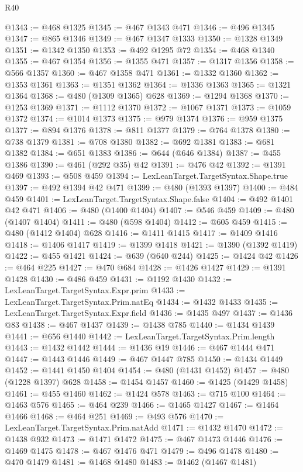 \begin{lexlean}{R40}
\begin{coremodule}
{{{{{{{{{{{{{{{{{{{{{{{{{{{{{{{{{{{{{{{{{{{{{{{{{{{{{{{{{{{{{{{{{{{{{{{{{{{{{{{{{{{{{{{{{{{{{{{{{{{{{{{{{{{{{@1343 := @468 @1325
@1345 := @467 @1343 @471
@1346 := @496 @1345
@1347 := @865 @1346
@1349 := @467 @1347 @1333
@1350 := @1328 @1349
@1351 := @1342 @1350
@1353 := @492 @1295 @72
@1354 := @468 @1340
@1355 := @467 @1354
@1356 := @1355 @471
@1357 := @1317 @1356
@1358 := @566 @1357
@1360 := @467 @1358 @471
@1361 := @1332 @1360
@1362 := @1353 @1361
@1363 := @1351 @1362
@1364 := @1336 @1363
@1365 := @1321 @1364
@1368 := @480 (@1309 @1365) @628
@1369 := @1294 @1368
@1370 := @1253 @1369
@1371 := @1112 @1370
@1372 := @1067 @1371
@1373 := @1059 @1372
@1374 := @1014 @1373
@1375 := @979 @1374
@1376 := @959 @1375
@1377 := @894 @1376
@1378 := @811 @1377
@1379 := @764 @1378
@1380 := @738 @1379
@1381 := @708 @1380
@1382 := @692 @1381
@1383 := @681 @1382
@1384 := @651 @1383
@1386 := @644 (@646 @1384)
@1387 := @455 @1386
@1390 := @461 (@292 @35) @42
@1391 := @476 @42
@1392 := @1391 @469
@1393 := @508 @459
@1394 := LexLeanTarget.TargetSyntax.Shape.true
@1397 := @492 @1394 @42 @471
@1399 := @480 (@1393 @1397)
@1400 := @484 @459
@1401 := LexLeanTarget.TargetSyntax.Shape.false
@1404 := @492 @1401 @42 @471
@1406 := @480 (@1400 @1404)
@1407 := @546 @459
@1409 := @480 (@1407 @1404)
@1411 := @480 (@598 @1404)
@1412 := @605 @459
@1415 := @480 (@1412 @1404) @628
@1416 := @1411 @1415
@1417 := @1409 @1416
@1418 := @1406 @1417
@1419 := @1399 @1418
@1421 := @1390 (@1392 @1419)
@1422 := @455 @1421
@1424 := @639 (@640 @244)
@1425 := @1424 @42
@1426 := @464 @225
@1427 := @470 @684
@1428 := @1426 @1427
@1429 := @1391 @1428
@1430 := @486 @459
@1431 := @1192 @1430
@1432 := LexLeanTarget.TargetSyntax.Expr.prim
@1433 := LexLeanTarget.TargetSyntax.Prim.natEq
@1434 := @1432 @1433
@1435 := LexLeanTarget.TargetSyntax.Expr.field
@1436 := @1435 @497
@1437 := @1436 @83
@1438 := @467 @1437
@1439 := @1438 @785
@1440 := @1434 @1439
@1441 := @656 @1440
@1442 := LexLeanTarget.TargetSyntax.Prim.length
@1443 := @1432 @1442
@1444 := @1436 @19
@1446 := @467 @1444 @471
@1447 := @1443 @1446
@1449 := @467 @1447 @785
@1450 := @1434 @1449
@1452 := @1441 @1450 @1404
@1454 := @480 (@1431 @1452)
@1457 := @480 (@1228 @1397) @628
@1458 := @1454 @1457
@1460 := @1425 (@1429 @1458)
@1461 := @455 @1460
@1462 := @1424 @578
@1463 := @715 @100
@1464 := @1463 @576
@1465 := @464 @239
@1466 := @1465 @1427
@1467 := @1464 @1466
@1468 := @464 @251
@1469 := @493 @576
@1470 := LexLeanTarget.TargetSyntax.Prim.natAdd
@1471 := @1432 @1470
@1472 := @1438 @932
@1473 := @1471 @1472
@1475 := @467 @1473 @1446
@1476 := @1469 @1475
@1478 := @467 @1476 @471
@1479 := @496 @1478
@1480 := @470 @1479
@1481 := @1468 @1480
@1483 := @1462 (@1467 @1481)
}}}}}}}}}}}}}}}}}}}}}}}}}}}}}}}}}}}}}}}}}}}}}}}}}}}}}}}}}}}}}}}}}}}}}}}}}}}}}}}}}}}}}}}}}}}}}}}}}}}}}}}}}}}}}
\end{coremodule}
\end{lexlean}
